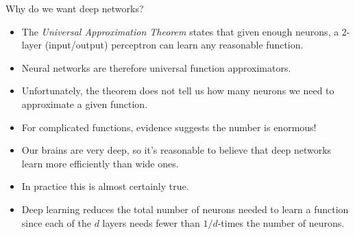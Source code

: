 \documentclass[9pt]{beamer}
\begin{document}
\begin{frame}{Why do we want deep networks?}

\begin{itemize}
	\item The \emph{Universal Approximation Theorem} states that given enough neurons, a 2-layer (input/output) perceptron can learn any reasonable function.
	\item Neural networks are therefore universal function approximators.
\end{itemize}

\pause
\begin{itemize}
	\item Unfortunately, the theorem does not tell us how many neurons we need to approximate a given function.
	\item For complicated functions, evidence suggests the number is enormous!
\end{itemize}

\pause
\begin{itemize}
	\item Our brains are very deep, so it's reasonable to believe that deep networks learn more efficiently than wide ones.
	\item In practice this is almost certainly true.
	\item Deep learning reduces the total number of neurons needed to learn a function since each of the $d$ layers needs fewer than $1/d$-times the number of neurons.
\end{itemize}
	
\end{frame}
\end{document}
